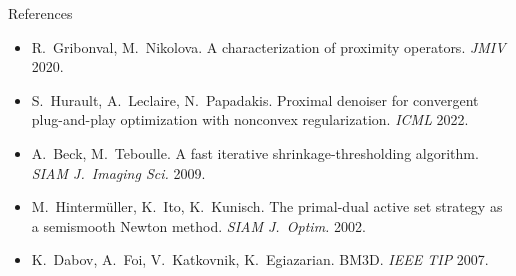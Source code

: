 \documentclass[10pt,aspectratio=169]{beamer}
\begin{document}
\begin{frame}[allowframebreaks]{References}
\begin{itemize}
\item R.~Gribonval, M.~Nikolova. A characterization of proximity operators. \emph{JMIV} 2020.
\item S.~Hurault, A.~Leclaire, N.~Papadakis. Proximal denoiser for convergent plug-and-play optimization with nonconvex regularization. \emph{ICML} 2022.
\item A.~Beck, M.~Teboulle. A fast iterative shrinkage-thresholding algorithm. \emph{SIAM J.\ Imaging Sci.} 2009.
\item M.~Hinterm\"uller, K.~Ito, K.~Kunisch. The primal-dual active set strategy as a semismooth Newton method. \emph{SIAM J.\ Optim.} 2002.
\item K.~Dabov, A.~Foi, V.~Katkovnik, K.~Egiazarian. BM3D. \emph{IEEE TIP} 2007.
\end{itemize}
\end{frame}
\end{document}
